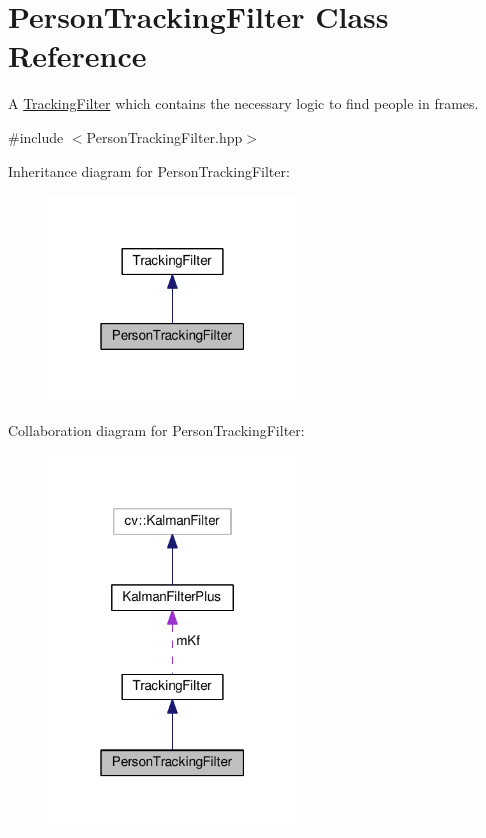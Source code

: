 \hypertarget{classPersonTrackingFilter}{}\section{Person\+Tracking\+Filter Class Reference}
\label{classPersonTrackingFilter}


A \hyperlink{classTrackingFilter}{Tracking\+Filter} which contains the necessary logic to find people in frames.  




{\ttfamily \#include $<$Person\+Tracking\+Filter.\+hpp$>$}



Inheritance diagram for Person\+Tracking\+Filter\+:\nopagebreak
\begin{figure}[H]
\begin{center}
\leavevmode
\includegraphics[width=187pt]{classPersonTrackingFilter__inherit__graph}
\end{center}
\end{figure}


Collaboration diagram for Person\+Tracking\+Filter\+:\nopagebreak
\begin{figure}[H]
\begin{center}
\leavevmode
\includegraphics[width=187pt]{classPersonTrackingFilter__coll__graph}
\end{center}
\end{figure}

